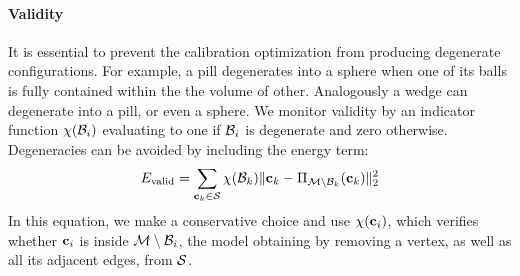 \paragraph{Validity}
It is essential to prevent the calibration optimization from producing degenerate configurations. For example, a pill degenerates into a sphere when one of its balls is fully contained within the the volume of other. Analogously a wedge can degenerate into a pill, or even a sphere. We monitor validity by an indicator function $\chi(\mathcal{B}_i)$ evaluating to one if $\mathcal{B}_i$ is degenerate and zero otherwise.
Degeneracies can be avoided by including the energy term:
% 
\begin{equation}
E_{\text{valid}} = \sum_{\mathbf{c}_k \in \mathcal{S}} \chi(\mathcal{B}_k) \| \mathbf{c}_k - \Pi_{\mathcal{M} \setminus \mathcal{B}_k}(\mathbf{c}_k) \|_2^2
\end{equation}
% 
In this equation, we make a conservative choice and use $\chi(\mathbf{c}_i)$, which verifies whether $\mathbf{c}_i$ is inside $\mathcal{M} \setminus \mathcal{B}_i$, the model obtaining by removing a vertex, as well as all its adjacent edges, from $\mathcal{S}$. 

\endinput



